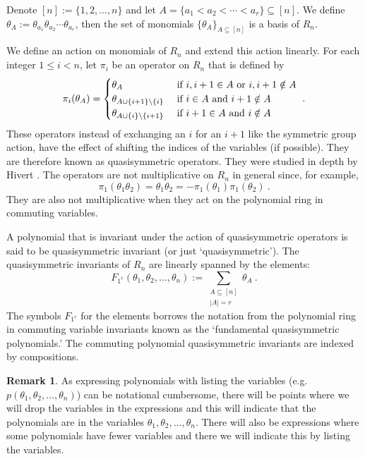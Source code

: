 \documentclass[11pt,oneside]{amsart}
\theoremstyle{definition}
\newtheorem{remark}[theorem]{Remark}
\numberwithin{equation}{section}
\begin{document}
Denote $[n] := \{1,2, \ldots,n\}$ and
let $A = \{a_1 < a_2 < \cdots < a_r \} \subseteq [n]$.
We define $\theta_A := \theta_{a_1} \theta_{a_2} \cdots \theta_{a_r}$,
then the set of monomials $\{ \theta_A \}_{A \subseteq [n]}$ is a basis of $R_n$.

We define an action on monomials of $R_n$ and extend this action linearly.
For each integer $1 \leq i < n$, let $\pi_i$ be an operator on $R_n$
that is defined by
\begin{equation}\label{eq:pi}
\pi_i(\theta_A) = \begin{cases}
\theta_{A} & \hbox{ if } i, i+1 \in A\hbox{ or }i, i+1 \notin A\\
\theta_{A \cup \{i+1\} \backslash \{i\}} & \hbox{ if } i\in A\hbox{ and }i+1 \notin A\\
\theta_{A \cup \{i\} \backslash \{i+1\}} & \hbox{ if } i+1\in A\hbox{ and }i \notin A
\end{cases}~.
\end{equation}
These operators instead of exchanging an $i$ for an $i+1$ like the symmetric group
action, have the effect of shifting the indices of the variables (if possible).  They
are therefore known as quasisymmetric operators.  They were studied in depth by
Hivert \cite{Hi}.  The operators are not multiplicative on $R_n$ in general since, for example,
\[
\pi_1( \theta_{1} \theta_{2})
= \theta_1 \theta_2
= - \pi_1( \theta_{1}) \pi_1(\theta_{2})~.
\]
They are also not multiplicative when they act on the polynomial ring
in commuting variables.

A polynomial that is invariant under the action of quasisymmetric operators
is said to be quasisymmetric invariant (or just `quasisymmetric').
The quasisymmetric invariants of $R_n$ are
linearly spanned by the elements:
\begin{equation}\label{eq:defF}
F_{1^r}(\theta_1, \theta_2, \ldots, \theta_n) := \sum_{\substack{A \subseteq [n]\\|A|=r}} \theta_A~.
\end{equation}
The symbols $F_{1^r}$ for the elements borrows the notation from the
polynomial ring in commuting variable invariants known as the `fundamental
quasisymmetric polynomials.'  The commuting polynomial quasisymmetric
invariants are indexed by compositions.

\begin{remark}
As expressing polynomials with listing the variables
(e.g. $p(\theta_1, \theta_2, \ldots, \theta_n)$) can be notational cumbersome,
there will be points where we will drop the variables in the expressions
and this will indicate that the polynomials are in the
variables $\theta_1, \theta_2, \ldots, \theta_n$.  There will also
be expressions where some polynomials have fewer variables and there
we will indicate this by listing the variables.
\end{remark}
\end{document}
